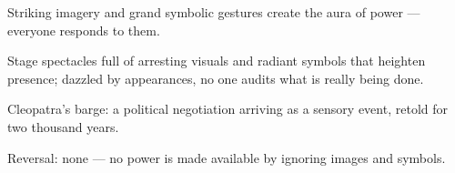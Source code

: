 

\begin{distilled}
  \item Striking imagery and grand symbolic gestures create the aura of power --- everyone responds to them.
  \item Stage spectacles full of arresting visuals and radiant symbols that heighten presence; dazzled by appearances, no one audits what is really being done.
  \item Cleopatra's barge: a political negotiation arriving as a sensory event, retold for two thousand years.
  \item Reversal: none --- no power is made available by ignoring images and symbols.
\end{distilled}
